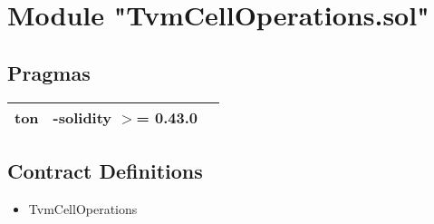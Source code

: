
\section{Module "TvmCellOperations.sol"}


\subsection{Pragmas}


\noindent\begin{tabular}{|l|l|p{5cm}|}\hline
ton & -solidity $>$= 0.43.0 &\\\hline
\end{tabular}


\subsection{Contract Definitions}

\begin{itemize}
\item TvmCellOperations
\end{itemize}
